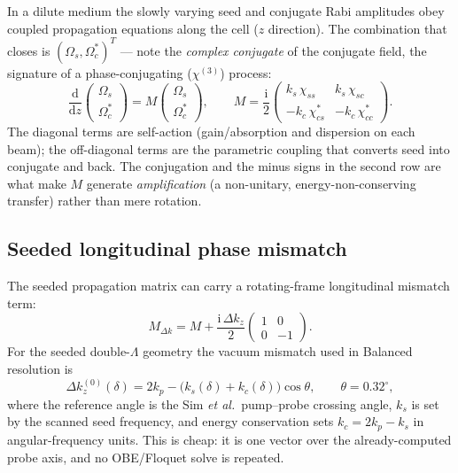 \documentclass[11pt]{article}
\newcommand{\ii}{\mathrm{i}}
\newcommand{\dd}{\mathrm{d}}
\begin{document}
In a dilute medium the slowly varying seed and conjugate Rabi amplitudes obey
coupled propagation equations along the cell ($z$ direction). The combination that
closes is $(\Omega_s,\Omega_c^{*})^{T}$ --- note the \emph{complex conjugate} of
the conjugate field, the signature of a phase-conjugating ($\chi^{(3)}$) process:
\begin{equation}
\frac{\dd}{\dd z}\begin{pmatrix}\Omega_s\\[2pt]\Omega_c^{*}\end{pmatrix}
= M\begin{pmatrix}\Omega_s\\[2pt]\Omega_c^{*}\end{pmatrix},
\qquad
M=\frac{\ii}{2}
\begin{pmatrix}
 k_s\,\chi_{ss} & k_s\,\chi_{sc}\\[4pt]
 -k_c\,\chi_{cs}^{*} & -k_c\,\chi_{cc}^{*}
\end{pmatrix}.
\label{eq:Mmatrix}
\end{equation}
The diagonal terms are self-action (gain/absorption and dispersion on each beam);
the off-diagonal terms are the parametric coupling that converts seed into
conjugate and back. The conjugation and the minus signs in the second row are what
make $M$ generate \emph{amplification} (a non-unitary, energy-non-conserving
transfer) rather than mere rotation.

\subsection{Seeded longitudinal phase mismatch}

The seeded propagation matrix can carry a rotating-frame longitudinal mismatch
term:
\begin{equation}
M_{\Delta k}=
M+
\frac{\ii\,\Delta k_z}{2}
\begin{pmatrix}
1 & 0\\
0 & -1
\end{pmatrix}.
\label{eq:Mdeltak}
\end{equation}
For the seeded double-$\Lambda$ geometry the vacuum mismatch used in Balanced
resolution is
\begin{equation}
\Delta k_z^{(0)}(\delta)
=2k_p-\big(k_s(\delta)+k_c(\delta)\big)\cos\theta,
\qquad
\theta=0.32^\circ,
\label{eq:seededDk}
\end{equation}
where the reference angle is the Sim \emph{et al.}\ pump--probe crossing angle,
$k_s$ is set by the scanned seed frequency, and energy conservation sets
$k_c=2k_p-k_s$ in angular-frequency units. This is cheap: it is one vector over
the already-computed probe axis, and no OBE/Floquet solve is repeated.
\end{document}

